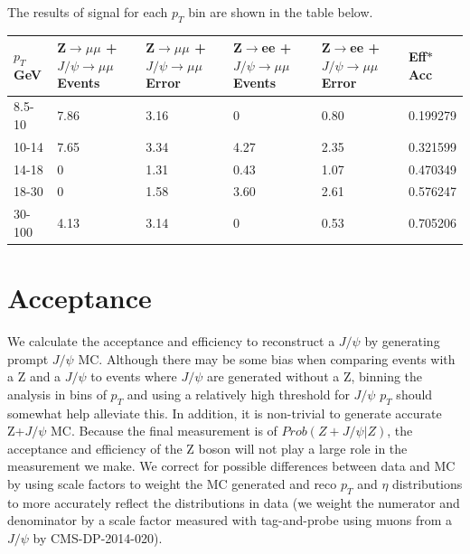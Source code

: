 \documentclass[a4paper,12pt]{article}
\begin{document}
The results of signal for each $p_T$ bin are shown in the table below.
\begin{center}
  \begin{tabular}{ | l | p{2cm} | p{2cm} | p{2cm} | p{2cm} | l | }
    \hline
    $p_T$ \unit{GeV} & Z$\rightarrow\mu\mu$ + $J\slash\psi\rightarrow\mu\mu$ Events & Z$\rightarrow\mu\mu$ + $J\slash\psi\rightarrow\mu\mu$ Error & Z$\rightarrow$ee +  $J\slash\psi\rightarrow\mu\mu$ Events & Z$\rightarrow$ee + $J\slash \psi\rightarrow\mu\mu$ Error & Eff$*$Acc \\ \hline
    8.5-10 & 7.86 & 3.16 & 0     & 0.80   & 0.199279 \\ \hline
    10-14  & 7.65 & 3.34 & 4.27  & 2.35   & 0.321599 \\ \hline
    14-18  & 0    & 1.31 & 0.43  & 1.07   & 0.470349 \\ \hline
    18-30  & 0    & 1.58 & 3.60  & 2.61   & 0.576247 \\ \hline
    30-100 & 4.13 & 3.14 & 0     & 0.53   & 0.705206 \\ \hline
    \hline
  \end{tabular}
\end{center}

\section{Acceptance}
We calculate the acceptance and efficiency to reconstruct a $J\slash\psi$ by generating prompt $J\slash \psi$ MC. Although there may be some bias when comparing events with a Z and a $J\slash \psi$ to events where $J\slash \psi$ are generated without a Z, binning the analysis in bins of $p_T$ and using a relatively high threshold for $J\slash \psi$ $p_T$ should somewhat help alleviate this. In addition, it is non-trivial to generate accurate Z+$J\slash \psi$ MC. Because the final measurement is of $Prob(Z + J\slash \psi | Z)$, the acceptance and efficiency of the Z boson will not play a large role in the measurement we make. We correct for possible differences between data and MC by using scale factors to weight the MC generated and reco $p_T$ and $\eta$ distributions to more accurately reflect the distributions in data (we weight the numerator and denominator by a scale factor measured with tag-and-probe using muons from a $J\slash \psi$ by CMS-DP-2014-020).
\end{document}
